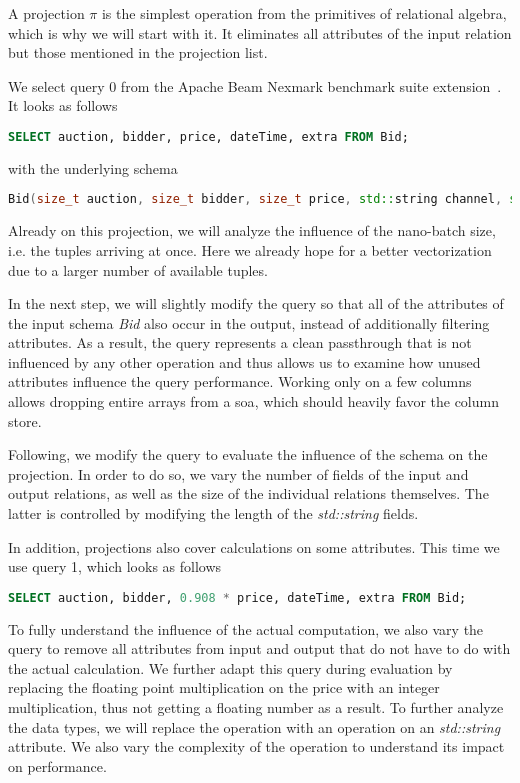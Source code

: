 A projection $\pi$ is the simplest operation from the primitives of relational algebra, which is why we will start with it.
It eliminates all attributes of the input relation but those mentioned in the projection list.

We select query 0 from the Apache Beam Nexmark benchmark suite extension~\cite[]{apachebeam}.
It looks as follows

\begin{lstlisting}[language=SQL]
SELECT auction, bidder, price, dateTime, extra FROM Bid;
\end{lstlisting}
with the underlying schema
\begin{lstlisting}[language=c++]
Bid(size_t auction, size_t bidder, size_t price, std::string channel, std::string url, time_t dateTime, std::string extra);
\end{lstlisting}

Already on this projection, we will analyze the influence of the nano-batch size, i.e. the tuples arriving at once.
Here we already hope for a better vectorization due to a larger number of available tuples.

In the next step, we will slightly modify the query so that all of the attributes of the input schema \emph{Bid} also occur in the output, instead of additionally filtering attributes.
As a result, the query represents a clean passthrough that is not influenced by any other operation and thus allows us to examine how unused attributes influence the query performance.
Working only on a few columns allows dropping entire arrays from a \ac{soa}, which should heavily favor the column store.

Following, we modify the query to evaluate the influence of the schema on the projection.
In order to do so, we vary the number of fields of the input and output relations, as well as the size of the individual relations themselves.
The latter is controlled by modifying the length of the \emph{std::string} fields.

In addition, projections also cover calculations on some attributes.
This time we use query 1, which looks as follows

\begin{lstlisting}[language=SQL]
SELECT auction, bidder, 0.908 * price, dateTime, extra FROM Bid;
\end{lstlisting}

To fully understand the influence of the actual computation, we also vary the query to remove all attributes from input and output that do not have to do with the actual calculation.
We further adapt this query during evaluation by replacing the floating point multiplication on the price with an integer multiplication, thus not getting a floating number as a result.
To further analyze the data types, we will replace the operation with an operation on an \emph{std::string} attribute.
We also vary the complexity of the operation to understand its impact on performance.


